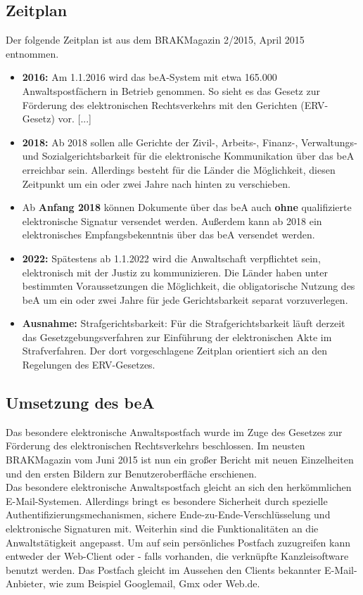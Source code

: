 \subsection{Zeitplan}
Der folgende Zeitplan ist aus dem BRAKMagazin 2/2015, April 2015\textcite{bea:bea:brak2-2015}  entnommen.
\begin{itemize}
\item \textbf{2016:} Am 1.1.2016 wird das beA-System mit etwa 165.000 Anwaltspostfächern in Betrieb genommen. So sieht es das Gesetz zur Förderung des elektronischen Rechtsverkehrs mit den Gerichten (ERV-Gesetz) vor. [...]
\item \textbf{2018:} Ab 2018 sollen alle Gerichte der Zivil-, Arbeits-, Finanz-, Verwaltungs- und Sozialgerichtsbarkeit für die elektronische Kommunikation über das beA erreichbar sein. Allerdings besteht für die Länder die Möglichkeit, diesen Zeitpunkt um ein oder zwei Jahre nach hinten zu verschieben.
\item Ab \textbf{Anfang 2018} können Dokumente über das beA auch \textbf{ohne} qualifizierte elektronische Signatur versendet werden. Außerdem kann ab 2018 ein elektronisches Empfangsbekenntnis über das beA versendet werden.
\item \textbf{2022:} Spätestens ab 1.1.2022 wird die Anwaltschaft verpflichtet sein, elektronisch mit der Justiz zu kommunizieren. Die Länder haben unter bestimmten Voraussetzungen die Möglichkeit, die obligatorische Nutzung des beA um ein oder zwei Jahre für jede Gerichtsbarkeit separat vorzuverlegen.
\item \textbf{Ausnahme:} Strafgerichtsbarkeit: Für die Strafgerichtsbarkeit läuft derzeit das Gesetzgebungsverfahren zur Einführung der elektronischen Akte im Strafverfahren. Der dort vorgeschlagene Zeitplan orientiert sich an den Regelungen des ERV-Gesetzes.
\end{itemize}

\subsection{Umsetzung des beA}
Das besondere elektronische Anwaltspostfach wurde im Zuge des Gesetzes zur Förderung des elektronischen Rechtsverkehrs beschlossen. Im neusten BRAKMagazin vom Juni 2015 \textcite{bea:bea:brak3-2015}  ist nun ein großer Bericht mit neuen Einzelheiten und den ersten Bildern zur Benutzeroberfläche erschienen. \\
Das besondere elektronische Anwaltspostfach gleicht an sich den herkömmlichen E-Mail-Systemen. Allerdings bringt es besondere Sicherheit durch spezielle Authentifizierungsmechanismen, sichere Ende-zu-Ende-Verschlüsselung und elektronische Signaturen mit. Weiterhin sind die Funktionalitäten an die Anwaltstätigkeit angepasst. Um auf sein persönliches Postfach zuzugreifen kann entweder der Web-Client oder - falls vorhanden, die verknüpfte Kanzleisoftware benutzt werden. Das Postfach gleicht im Aussehen den Clients bekannter E-Mail-Anbieter, wie zum Beispiel Googlemail, Gmx oder Web.de.

